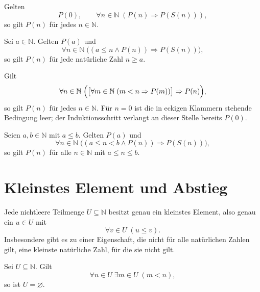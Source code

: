 \begin{theorem}
\label{b10guide:thm:induction}
Gelten
\[
 P(0),\qquad
 \forall n\in\mathbb N\;(P(n)\Rightarrow P(S(n))),
\]
so gilt $P(n)$ für jedes $n\in\mathbb N$.
\end{theorem}

\begin{theorem}
\label{b10guide:thm:tail-induction}
Sei $a\in\mathbb N$. Gelten $P(a)$ und
\[
 \forall n\in\mathbb N\;
 \bigl((a\le n\land P(n))\Rightarrow P(S(n))\bigr),
\]
so gilt $P(n)$ für jede natürliche Zahl $n\ge a$.
\end{theorem}

\begin{theorem}
\label{b10guide:thm:strong-induction}
Gilt
\[
 \forall n\in\mathbb N\;
 \Bigl(\bigl[\forall m\in\mathbb N\;(m<n\Rightarrow P(m))\bigr]
      \Rightarrow P(n)\Bigr),
\]
so gilt $P(n)$ für jedes $n\in\mathbb N$.
Für $n=0$ ist die in eckigen Klammern stehende Bedingung leer;
der Induktionsschritt verlangt an dieser Stelle bereits $P(0)$.
\end{theorem}

\begin{theorem}
\label{b10guide:thm:interval-induction}
Seien $a,b\in\mathbb N$ mit $a\le b$. Gelten $P(a)$ und
\[
 \forall n\in\mathbb N\;
 \bigl((a\le n<b\land P(n))\Rightarrow P(S(n))\bigr),
\]
so gilt $P(n)$ für alle $n\in\mathbb N$ mit $a\le n\le b$.
\end{theorem}

\section{Kleinstes Element und Abstieg}

\begin{theorem}
\label{b10guide:thm:least-number}
Jede nichtleere Teilmenge $U\subseteq\mathbb N$ besitzt genau ein
kleinstes Element, also genau ein $u\in U$ mit
\[
 \forall v\in U\;(u\le v).
\]
Insbesondere gibt es zu einer Eigenschaft, die nicht für alle
natürlichen Zahlen gilt, eine kleinste natürliche Zahl, für die sie
nicht gilt.
\end{theorem}

\begin{theorem}
\label{b10guide:thm:descent}
Sei $U\subseteq\mathbb N$. Gilt
\[
 \forall n\in U\;\exists m\in U\;(m<n),
\]
so ist $U=\varnothing$.
\end{theorem}
